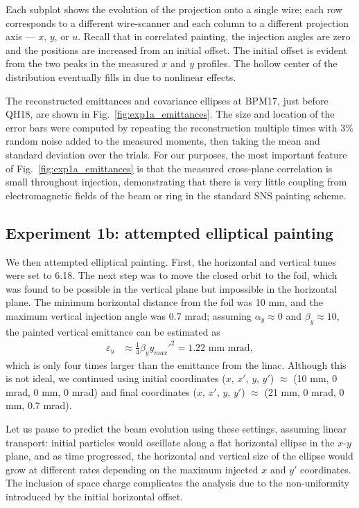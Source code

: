 %
Each subplot shows the evolution of the projection onto a single wire; each row corresponds to a different wire-scanner and each column to a different projection axis — $x$, $y$, or $u$. Recall that in correlated painting, the injection angles are zero and the positions are increased from an initial offset. The initial offset is evident from the two peaks in the measured $x$ and $y$ profiles. The hollow center of the distribution eventually fills in due to nonlinear effects.

The reconstructed emittances and covariance ellipses at BPM17, just before QH18, are shown in Fig.~\ref{fig:exp1a_emittances}. The size and location of the error bars were computed by repeating the reconstruction multiple times with 3\% random noise added to the measured moments, then taking the mean and standard deviation over the trials. For our purposes, the most important feature of Fig.~\ref{fig:exp1a_emittances} is that the measured cross-plane correlation is small throughout injection, demonstrating that there is very little coupling from electromagnetic fields of the beam or ring in the standard SNS painting scheme.


\subsection{Experiment 1b: attempted elliptical painting}

We then attempted elliptical painting. First, the horizontal and vertical tunes were set to 6.18. The next step was to move the closed orbit to the foil, which was found to be possible in the vertical plane but impossible in the horizontal plane. The minimum horizontal distance from the foil was 10 mm, and the maximum vertical injection angle was 0.7 mrad; assuming $\alpha_y \approx 0$ and $\beta_y \approx 10$, the painted vertical emittance can be estimated as
%
\begin{equation}
\begin{aligned}
    \varepsilon_y 
    &\approx \frac{1}{4}\beta_y {y_{max}'}^2
    = 1.22 \,\, \text{mm~mrad},
\end{aligned}
\end{equation}
%
which is only four times larger than the emittance from the linac. Although this is not ideal, we continued using initial coordinates ($x$, $x'$, $y$, $y'$) $\approx$ (10 mm, 0 mrad, 0 mm, 0 mrad) and final coordinates ($x$, $x'$, $y$, $y'$) $\approx$ (21 mm, 0 mrad, 0 mm, 0.7 mrad).

Let us pause to predict the beam evolution using these settings, assuming linear transport: initial particles would oscillate along a flat horizontal ellipse in the $x$-$y$ plane, and as time progressed, the horizontal and vertical size of the ellipse would grow at different rates depending on the maximum injected $x$ and $y'$ coordinates. The inclusion of space charge complicates the analysis due to the non-uniformity introduced by the initial horizontal offset. 


